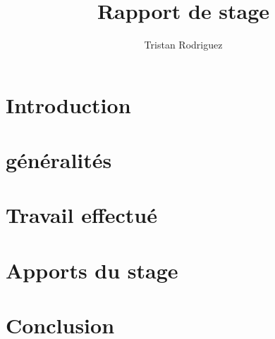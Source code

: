 \documentclass{univ-projet}
\author{Tristan Rodriguez}
\title{Rapport de stage}
\begin{document}
  \maketitle
  \tableofcontents
  \clearpage
  
  \section{Introduction}
  \label{sec:Introduction}
  
  
  \section{généralités}
  \label{sec:généralités}
  
    
  \section{Travail effectué}
  \label{sec:Travail effectué}
  

  \section{Apports du stage}
  \label{Apports du stage}
  
  
  \section{Conclusion}
  \label{sec:conclusion}
  
  
\end{document}
